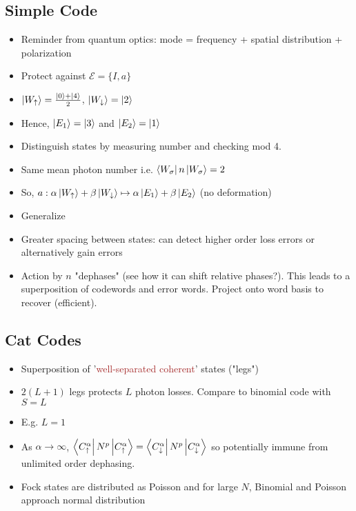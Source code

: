 \documentclass[english]{article}
\begin{document}
\subsection*{Simple Code}

\begin{itemize}
\item Reminder from quantum optics: mode = frequency + spatial distribution + polarization
\item Protect against $\mathcal{E} = \{ I,a\}$
\item $\ket{W_\uparrow} = \frac{\ket{0} + \ket{4}}{2}$, $\ket{W_\downarrow} = \ket{2}$
\item Hence, $\ket{E_1} = \ket{3}$ and $\ket{E_2} = \ket{1}$
\item Distinguish states by measuring number and checking mod 4.
\item Same mean photon number i.e. $\bra{W_\sigma} n \ket{W_\sigma} = 2$
\item So, $a : \alpha\ket{W_\uparrow} + \beta\ket{W_\downarrow} \mapsto \alpha \ket{E_1} + \beta \ket{E_2}$ (no deformation)
\item Generalize
\item Greater spacing between states: can detect higher order loss errors or alternatively gain errors
\item Action by $n$ "dephases" (see how it can shift relative phases?). This leads to a superposition of codewords and error words. Project onto word basis to recover (efficient).
\end{itemize}

\subsection*{Cat Codes}

\begin{itemize}
\item Superposition of '\textcolor{brown}{well-separated coherent}' states ("legs")
\item $2(L+1)$ legs protects $L$ photon losses. Compare to binomial code with $S=L$
\item E.g. $L=1$
\item As $\alpha \rightarrow \infty$, $\bra{C^\alpha_{\uparrow}} N^p \ket{C^\alpha_{\uparrow}} = \bra{C^\alpha_{\downarrow}} N^p \ket{C^\alpha_{\downarrow}}$ so potentially immune from unlimited order dephasing.
\item Fock states are distributed as Poisson and for large $N$, Binomial and Poisson approach normal distribution
\end{itemize}
\end{document}
